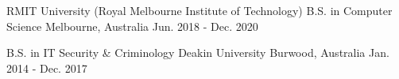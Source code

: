 
\vspace*{-0.7cm}
\begin{cventries}
  \cventry
    {RMIT University (Royal Melbourne Institute of Technology)} {B.S. in Computer Science}
    {Melbourne, Australia} {Jun. 2018 - Dec. 2020}
    {
      \begin{cvitems}
      \end{cvitems}
    }
    
\vspace*{-1cm}
  \cventry
    {B.S. in IT Security \& Criminology}
    {Deakin University}
    {Burwood, Australia}
    {Jan. 2014 - Dec. 2017}
    {
      \begin{cvitems}
      \end{cvitems}
    }
\end{cventries}
